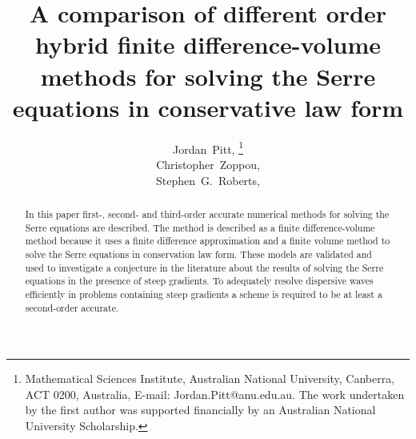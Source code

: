 \documentclass[SingleSpace,12pt,Proceedings]{Serre_ASCE}
\begin{document}
\title{A comparison of different order hybrid finite difference-volume methods for solving the Serre equations in conservative law form}

\author{
Jordan~Pitt,%
\thanks{Mathematical Sciences Institute, Australian National University, Canberra, ACT 0200, Australia, E-mail: Jordan.Pitt@anu.edu.au. The work undertaken by the first author was supported financially by an Australian National University Scholarship.}
\\
Christopher~Zoppou,\footnotemark[1]%
%
\\
Stephen~G.~Roberts,\footnotemark[1]
}

\maketitle

\begin{abstract}
In this paper first-, second- and third-order accurate numerical methods for solving the Serre equations are described. The method is described as a finite difference-volume method because it uses a finite difference approximation and a finite volume method to solve the Serre equations in conservation law form. These models are validated and used to investigate a conjecture in the literature about the results of solving the Serre equations in the presence of steep gradients. To adequately resolve dispersive waves efficiently in problems containing steep gradients a scheme is required to be at least a second-order accurate.

\end{abstract}


\linenumbers

\end{document}

